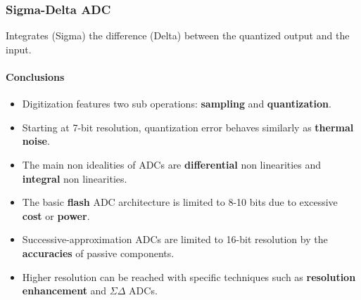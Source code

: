 \subsubsection{Sigma-Delta ADC}
Integrates (Sigma) the difference (Delta) between the quantized output and the input.

\paragraph{Conclusions}

\begin{itemize}
    \item Digitization features two sub operations: \textbf{sampling }and \textbf{quantization}.
    \item Starting at 7-bit resolution, quantization error behaves similarly as \textbf{thermal noise}.
    \item The main non idealities of ADCs are \textbf{differential} non linearities and \textbf{integral} non linearities.
    \item The basic \textbf{flash} ADC architecture is limited to 8-10 bits due to excessive \textbf{cost} or \textbf{power}.
    \item Successive-approximation ADCs are limited to 16-bit resolution by the \textbf{accuracies} of passive components.
    \item Higher resolution can be reached with specific techniques such as \textbf{resolution enhancement} and $\Sigma \Delta$ ADCs.
\end{itemize}
